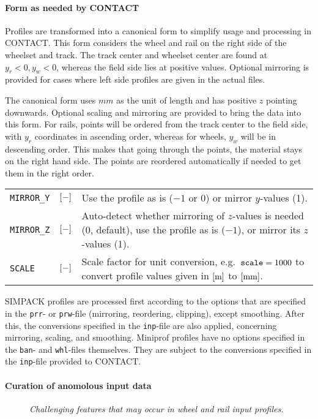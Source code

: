 \documentclass[12pt]{report}
\newenvironment{inputvars}{\vspace{0.4\baselineskip}%

\begin{tabular}{>{\raggedright}p{22mm}p{19mm}p{113mm}}}{
\end{tabular}

}
\newcommand{\inpvar}[3]{{\small\tt #1} & $#2$ & #3 \\[1ex]}
\begin{document}
\paragraph{Form as needed by CONTACT}

Profiles are transformed into a canonical form to simplify usage and
processing in CONTACT. This form considers the wheel and rail on the right
side of the wheelset and track. The track center and wheelset center are
found at $y_r<0, y_w<0$, whereas the field side lies at positive values.
Optional mirroring is provided for cases where left side profiles are
given in the actual files. 

The canonical form uses $\unit{mm}$ as the unit of length and has positive
$z$ pointing downwards. Optional scaling and mirroring are provided to
bring the data into this form. For rails, points will be ordered from the
track center to the field side, with $y_r$ coordinates in ascending order,
whereas for wheels, $y_w$ will be in descending order. This makes that going
through the points, the material stays on the right hand side.
The points are reordered automatically if needed to get them in the right
order.
\begin{inputvars}
\inpvar{MIRROR\_Y}{\bunit{-}}{Use the profile as is ($-1$ or $0$) or mirror
        $y$-values (1).}
\inpvar{MIRROR\_Z}{\bunit{-}}{Auto-detect whether mirroring of $z$-values is
        needed (0, default), use the profile as is ($-1$), or mirror its
        $z$-values (1).}
\inpvar{SCALE}{\bunit{-}}{Scale factor for unit conversion, e.g.\ 
        ${\tt scale}=1000$ to convert profile values given in $[\mathrm{m}]$ to
        $[\mathrm{mm}]$.} 
\end{inputvars}
SIMPACK profiles are processed first according to the options that are
specified in the {\tt prr}- or {\tt prw}-file (mirroring, reordering,
clipping), except smoothing. After this, the conversions specified in the
{\tt inp}-file are also applied, concerning mirroring, scaling, and
smoothing. Miniprof profiles have no options specified in the {\tt ban}-
and {\tt whl}-files themselves. They are subject to the conversions
specified in the {\tt inp}-file provided to CONTACT.

\paragraph{Curation of anomolous input data}

\begin{figure}[bt]
\centering
{}
\caption{\em Challenging features that may occur in wheel and rail input
        profiles.}
\label{fig:profile_errors}
\end{figure}
\end{document}
